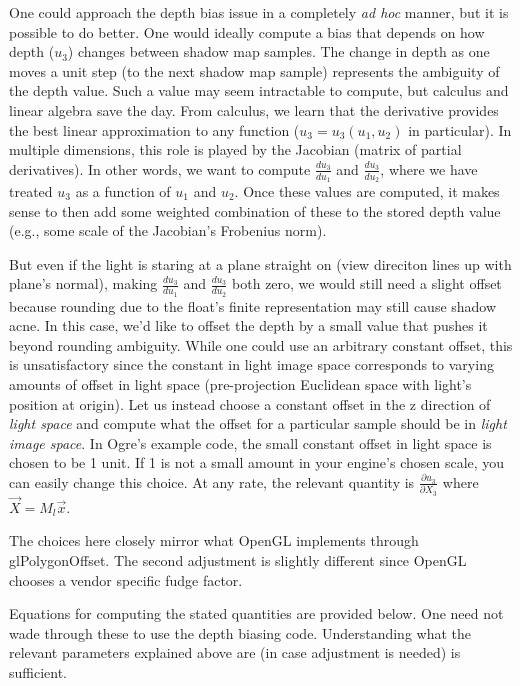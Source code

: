 \documentclass[]{article}  %
\begin{document}
One could approach the depth bias issue in a completely {\em ad hoc} manner, but it is possible to do better.  One would ideally compute a bias that depends on how depth ($u_3$) changes between shadow map samples.  The change in depth as one moves a unit step (to the next shadow map sample) represents the ambiguity of the depth value.  Such a value may seem intractable to compute, but calculus and linear algebra save the day.  From calculus, we learn that the derivative provides the best linear approximation to any function ($u_3 = u_3(u_1, u_2)$ in particular).  In multiple dimensions, this role is played by the Jacobian (matrix of partial derivatives).  In other words, we want to compute $\frac{du_3}{du_1}$ and $\frac{du_3}{du_2}$, where we have treated $u_3$ as a function of $u_1$ and $u_2$.  Once these values are computed, it makes sense to then add some weighted combination of these to the stored depth value (e.g., some scale of the Jacobian's Frobenius norm).  

But even if the light is staring at a plane straight on (view direciton lines up with plane's normal), making $\frac{du_3}{du_1}$ and $\frac{du_3}{du_2}$ both zero, we would still need a slight offset because rounding due to the float's finite representation may still cause shadow acne.  In this case, we'd like to offset the depth by a small value that pushes it beyond rounding ambiguity.  While one could use an arbitrary constant offset, this is unsatisfactory since the constant in light image space corresponds to varying amounts of offset in light space (pre-projection Euclidean space with light's position at origin).  Let us instead choose a constant offset in the z direction of {\em light space} and compute what the offset for a particular sample should be in {\em light image space}.  In Ogre's example code, the small constant offset in light space is chosen to be 1 unit.  If 1 is not a small amount in your engine's chosen scale, you can easily change this choice.  At any rate, the relevant quantity is $\frac{\partial u_3}{\partial X_3}$ where $\vec{X} = M_l \vec{x}$.

The choices here closely mirror what OpenGL implements through glPolygonOffset.  The second adjustment is slightly different since OpenGL chooses a vendor specific fudge factor.  

Equations for computing the stated quantities are provided below.  One need not wade through these to use the depth biasing code.  Understanding what the relevant parameters explained above are (in case adjustment is needed) is sufficient.
\end{document}

